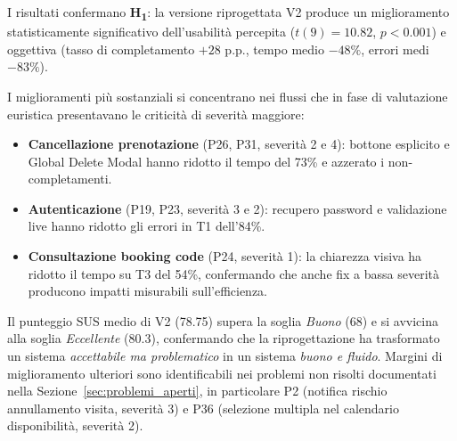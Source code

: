 I risultati confermano \textbf{H\textsubscript{1}}: la versione riprogettata V2 produce un miglioramento statisticamente significativo dell'usabilità percepita ($t(9) = 10.82$, $p < 0.001$) e oggettiva (tasso di completamento $+28$ p.p., tempo medio $-48\%$, errori medi $-83\%$).

I miglioramenti più sostanziali si concentrano nei flussi che in fase di valutazione euristica presentavano le criticità di severità maggiore:

\begin{itemize}
    \item \textbf{Cancellazione prenotazione} (P26, P31, severità 2 e 4): bottone esplicito e Global Delete Modal hanno ridotto il tempo del 73\% e azzerato i non-completamenti.
    \item \textbf{Autenticazione} (P19, P23, severità 3 e 2): recupero password e validazione live hanno ridotto gli errori in T1 dell'84\%.
    \item \textbf{Consultazione booking code} (P24, severità 1): la chiarezza visiva ha ridotto il tempo su T3 del 54\%, confermando che anche fix a bassa severità producono impatti misurabili sull'efficienza.
\end{itemize}

Il punteggio SUS medio di V2 (78.75) supera la soglia \textit{Buono} (68) e si avvicina alla soglia \textit{Eccellente} (80.3), confermando che la riprogettazione ha trasformato un sistema \textit{accettabile ma problematico} in un sistema \textit{buono e fluido}. Margini di miglioramento ulteriori sono identificabili nei problemi non risolti documentati nella Sezione~\ref{sec:problemi_aperti}, in particolare P2 (notifica rischio annullamento visita, severità 3) e P36 (selezione multipla nel calendario disponibilità, severità 2).
